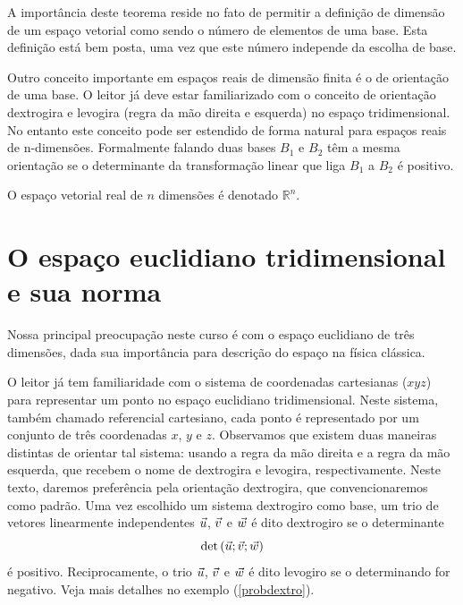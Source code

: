 A importância deste teorema reside no fato de permitir a definição de dimensão de um espaço vetorial como sendo o número de elementos de uma base. Esta definição está bem posta, uma vez que este número independe da escolha de base.

Outro conceito importante em espaços reais de dimensão finita é o de orientação de uma base. O leitor já deve estar familiarizado com o conceito de orientação dextrogira e levogira (regra da mão direita e esquerda) no espaço tridimensional. No entanto este conceito pode ser estendido de forma natural para espaços reais de n-dimensões. Formalmente falando duas bases $B_1$ e $B_2$ têm a mesma orientação se o determinante da transformação linear que liga $B_1$ a $B_2$ é positivo.    

O espaço vetorial real de $n$ dimensões é denotado $\mathbb{R}^n$. 

\section{O espaço euclidiano tridimensional e sua norma}
Nossa principal preocupação neste curso é com o espaço euclidiano de três dimensões, dada sua importância para descrição do espaço na física clássica.  

  
    
    O leitor já tem familiaridade com o sistema de coordenadas cartesianas ($xyz$) para representar um ponto no espaço euclidiano tridimensional. Neste sistema, também chamado referencial cartesiano, cada ponto é representado por um conjunto de três coordenadas $x$, $y$ e $z$. Observamos que existem duas maneiras distintas de orientar tal sistema: usando a regra da mão direita e a regra da mão esquerda, que recebem o nome de dextrogira e levogira, respectivamente. Neste texto, daremos preferência pela orientação dextrogira, que convencionaremos como padrão. Uma vez escolhido um sistema dextrogiro como base,  um trio de vetores linearmente independentes $\vec{u}$, $\vec{v}$ e  $\vec{w}$ é dito dextrogiro se o determinante 
\begin{equation}\label{defdextro}
\det\left(\vec{u};\vec{v};\vec{w}\right)
\end{equation}   
é positivo. Reciprocamente, o trio  $\vec{u}$, $\vec{v}$ e  $\vec{w}$ é dito levogiro se o determinando for negativo. Veja mais detalhes no exemplo (\ref{probdextro}).


